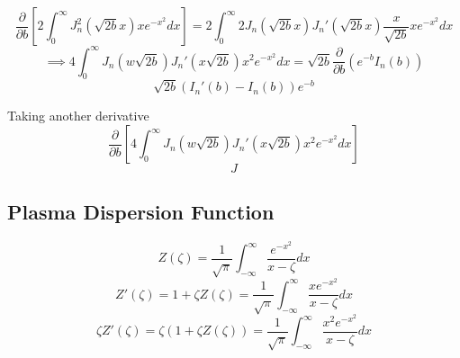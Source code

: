 \begin{equation*}
	\frac{\partial}{\partial b} \left[ 2\int_0^\infty J_n^2 \left( \sqrt{2b} x \right) x e^{-x^2} dx \right] = 2\int_0^\infty 2 J_n \left( \sqrt{2b} x \right) J_n' \left( \sqrt{2b} x \right) \frac{x}{\sqrt{2b}} xe^{-x^2} dx
\end{equation*}
\begin{equation*}
	\implies 4\int_0^\infty J_n \left( w \sqrt{2b} \right) J_n' \left( x \sqrt{2b} \right) x^2 e^{-x^2} dx = \sqrt{2b} \frac{\partial}{\partial b} \left( e^{-b} I_n(b) \right)
\end{equation*}
\begin{equation}
	\sqrt{2b} \left(I_n'(b) - I_n(b) \right) e^{-b}
\end{equation}

Taking another derivative
\begin{equation*}
	\frac{\partial}{\partial b} \left[ 4\int_0^\infty J_n \left( w \sqrt{2b} \right) J_n' \left( x \sqrt{2b} \right) x^2 e^{-x^2} dx \right]
\end{equation*}
\begin{equation}
	J
\end{equation}

\subsection{Plasma Dispersion Function}
\begin{equation}
	Z(\zeta) = \frac{1}{\sqrt{\pi}} \int_{-\infty}^\infty \frac{e^{-x^2}}{x-\zeta} dx
\end{equation}
\begin{equation}
	Z'(\zeta) = 1 + \zeta Z(\zeta) = \frac{1}{\sqrt{\pi}} \int_{-\infty}^\infty \frac{xe^{-x^2}}{x-\zeta} dx
\end{equation}
\begin{equation}
	\zeta Z'(\zeta) = \zeta \left( 1 + \zeta Z(\zeta) \right) = \frac{1}{\sqrt{\pi}} \int_{-\infty}^\infty \frac{x^2 e^{-x^2}}{x-\zeta} dx
\end{equation}
